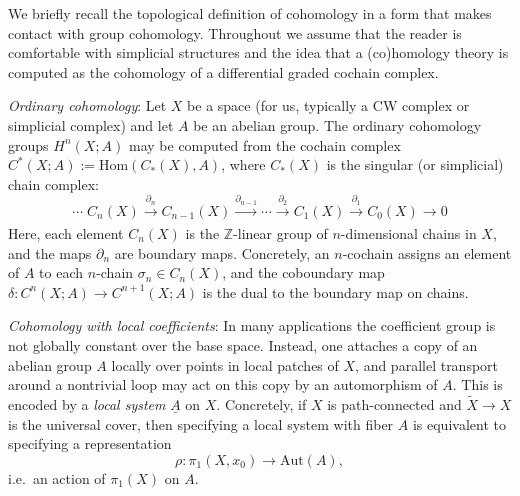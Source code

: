 \documentclass[aps,prx,reprint,superscriptaddress,twocolumn,amsmath,amssymb,amsfonts, nofootinbib]{revtex4-2}
\theoremstyle{apsstyle}
\begin{document}
We briefly recall the topological definition of cohomology in a form that makes contact with group cohomology. Throughout we assume that the reader is comfortable with simplicial structures and the idea that a (co)homology theory is computed as the cohomology of a differential graded cochain complex.

\bigskip 

\noindent \textit{Ordinary cohomology}:
Let $X$ be a space (for us, typically a CW complex or simplicial complex) and let $A$ be an abelian group. The ordinary cohomology groups $H^n(X;A)$ may be computed from the cochain complex $C^\ast(X;A):=\mathrm{Hom}(C_\ast(X),A)$, where $C_\ast(X)$ is the singular (or simplicial) chain complex:
\begin{equation*}
    \cdots \;C_{n}(X) \xrightarrow[]{\partial_{n}} C_{n-1}(X) \xrightarrow[]{\partial_{n-1}} \cdots \xrightarrow[]{\partial_{2}} C_{1}(X) \xrightarrow[]{\partial_{1}} C_{0}(X) \to 0
\end{equation*}
Here, each element $C_{n}(X)$ is the $\mathbb{Z}$-linear group of $n$-dimensional chains in $X$, and the maps $\partial_{n}$ are boundary maps. Concretely, an $n$-cochain assigns an element of $A$ to each $n$-chain $\sigma_{n}\in C_{n}(X)$, and the coboundary map $\delta:C^n(X;A)\to C^{n+1}(X;A)$ is the dual to the boundary map on chains.

\bigskip 


\noindent \textit{Cohomology with local coefficients}:
In many applications the coefficient group is not globally constant over the base space. Instead, one attaches a copy of an abelian group $A$ locally over points in local patches of $X$, and parallel transport around a nontrivial loop may act on this copy by an automorphism of $A$.
This is encoded by a \emph{local system} $\underline{A}$ on $X$. Concretely, if $X$ is path-connected and $\widetilde{X}\to X$ is the universal cover, then specifying a local system with fiber $A$ is equivalent to specifying a representation
\begin{equation}
    \rho:\pi_1(X,x_0)\to \mathrm{Aut}(A),
    \label{eq:local_sys_rho}
\end{equation}
i.e.\ an action of $\pi_1(X)$ on $A$.

\medskip 
\end{document}
